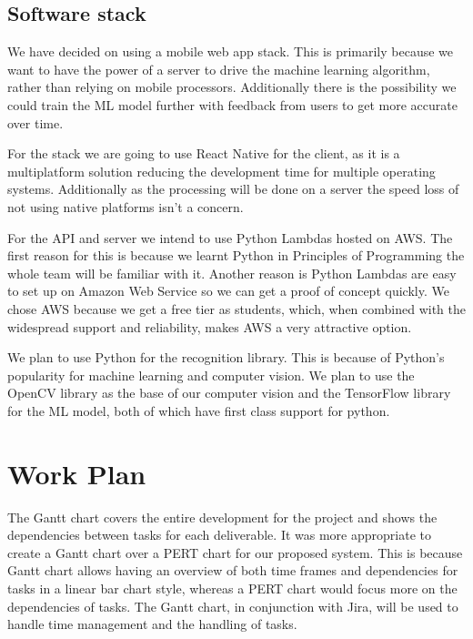 \documentclass[10pt]{article}
\begin{document}
\subsection{Software stack}

We have decided on using a mobile web app stack. This is primarily because we want to have the power of a server to drive the machine learning algorithm, rather than relying on mobile processors. Additionally there is the possibility we could train the ML model further with feedback from users to get more accurate over time.

For the stack we are going to use React Native for the client, as it is a multiplatform solution reducing the development time for multiple operating systems. Additionally as the processing will be done on a server the speed loss of not using native platforms isn’t a concern.

For the API and server we intend to use Python Lambdas hosted on AWS. The first reason for this is because we learnt Python in Principles of Programming the whole team will be familiar with it. Another reason is Python Lambdas are easy to set up on Amazon Web Service so we can get a proof of concept quickly. We chose AWS because we get a free tier as students, which, when combined with the widespread support and reliability, makes AWS a very attractive option.

We plan to use Python for the recognition library. This is because of Python's popularity for machine learning and computer vision. We plan to use the OpenCV library as the base of our computer vision and the TensorFlow library for the ML model, both of which have first class support for python.


\section{Work Plan}

The Gantt chart covers the entire development for the project and shows the dependencies between 
tasks for each deliverable. It was more appropriate to create a Gantt chart over a PERT chart for 
our proposed system. This is because Gantt chart allows having an overview of both time frames and 
dependencies for tasks in a linear bar chart style, whereas a PERT chart would focus more on the 
dependencies of tasks. The Gantt chart, in conjunction with Jira, will be used to handle time 
management and the handling of tasks.
\end{document}
